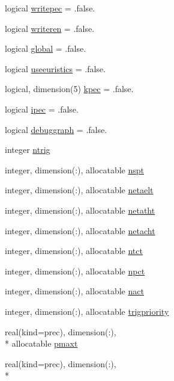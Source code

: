 \begin{DoxyCompactItemize}
\item 
logical \hyperlink{classinputvar_a81f46f9ef3ef3bdb78c79994791f3472}{writepec} = .false.
\item 
logical \hyperlink{classinputvar_aaea9119ed7c4fbad274831007b696f46}{writeren} = .false.
\item 
logical \hyperlink{classinputvar_aa558f36057a5ae647fb16b9659b90d04}{global} = .false.
\item 
logical \hyperlink{classinputvar_a04f11d38b133803024202cc546abddc3}{useeuristics} = .false.
\item 
logical, dimension(5) \hyperlink{classinputvar_a17bd2d4ef6c3b43e7b2d447f1fab021e}{kpec} = .false.
\item 
logical \hyperlink{classinputvar_af90e08308cf6a7de1480cfde429187d3}{ipec} = .false.
\item 
logical \hyperlink{classinputvar_a947a874d54b261f96d17c5030a87d4e4}{debuggraph} = .false.
\item 
integer \hyperlink{classinputvar_ae4403f5c5b16bf2cbd2b607a87e5ee9a}{ntrig}
\item 
integer, dimension(\-:), allocatable \hyperlink{classinputvar_a0c86e9a7915872ee547e5bd8802611e7}{nspt}
\item 
integer, dimension(\-:), allocatable \hyperlink{classinputvar_a2bfcb389a7fba156b8c1146150a71f51}{netaelt}
\item 
integer, dimension(\-:), allocatable \hyperlink{classinputvar_acebcf3d64f116183dd364e920288729f}{netatht}
\item 
integer, dimension(\-:), allocatable \hyperlink{classinputvar_a7f82eda09f512dfe2f28f82efc5187ad}{netacht}
\item 
integer, dimension(\-:), allocatable \hyperlink{classinputvar_ad5c9bbca95851da9fa84642ea414e6be}{ntct}
\item 
integer, dimension(\-:), allocatable \hyperlink{classinputvar_a0f5eeaa6713564c7a3aa547b8ce8bae9}{npct}
\item 
integer, dimension(\-:), allocatable \hyperlink{classinputvar_aecb7a7ef500aee2174166b23b5c72e2a}{nact}
\item 
integer, dimension(\-:), allocatable \hyperlink{classinputvar_aa06cb5d284b385bcfed4e6f34efa534f}{trigpriority}
\item 
real(kind=prec), dimension(\-:), \\*
allocatable \hyperlink{classinputvar_a0a9434332c855a12ef886b675af68d35}{pmaxt}
\item 
real(kind=prec), dimension(\-:), \\*

\end{DoxyCompactItemize}
